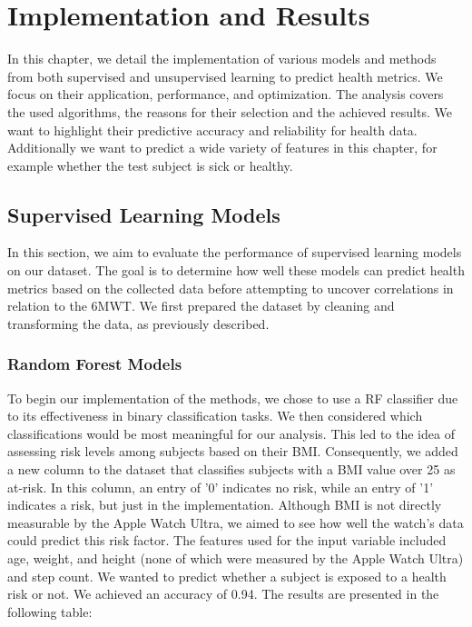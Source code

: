 \chapter{Implementation and Results}
\label{cha:results}

In this chapter, we detail the implementation of various models and methods from both supervised and unsupervised learning to predict health metrics. We focus on their application, performance, and optimization. The analysis covers the used algorithms, the reasons for their selection and the achieved results. We want to highlight their predictive accuracy and reliability for health data. Additionally we want to predict a wide variety of features in this chapter, for example whether the test subject is sick or healthy.

\section{Supervised Learning Models}

In this section, we aim to evaluate the performance of supervised learning models on our dataset. The goal is to determine how well these models can predict health metrics based on the collected data before attempting to uncover correlations in relation to the 6MWT. We first prepared the dataset by cleaning and transforming the data, as previously described.

\subsection{Random Forest Models}

To begin our implementation of the methods, we chose to use a RF classifier due to its effectiveness in binary classification tasks. We then considered which classifications would be most meaningful for our analysis. This led to the idea of assessing risk levels among subjects based on their BMI. Consequently, we added a new column to the dataset that classifies subjects with a BMI value over 25 as at-risk. In this column, an entry of '0' indicates no risk, while an entry of '1' indicates a risk, but just in the implementation. Although BMI is not directly measurable by the Apple Watch Ultra, we aimed to see how well the watch's data could predict this risk factor. The features used for the input variable included age, weight, and height (none of which were measured by the Apple Watch Ultra) and step count. We wanted to predict whether a subject is exposed to a health risk or not. We achieved an accuracy of 0.94. The results are presented in the following table:

